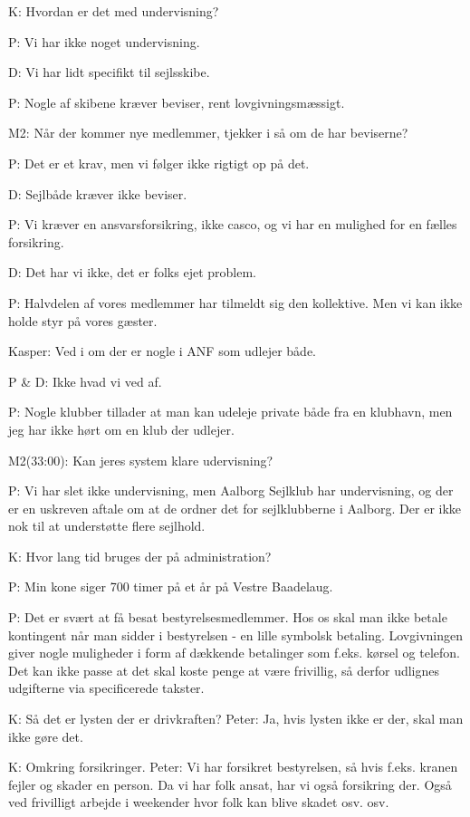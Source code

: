 \documentclass{article}
\begin{document}
K: Hvordan er det med undervisning?

P: Vi har ikke noget undervisning.

D: Vi har lidt specifikt til sejlsskibe.

P: Nogle af skibene kræver beviser, rent lovgivningsmæssigt. 

M2: Når der kommer nye medlemmer, tjekker i så om de har beviserne?

P: Det er et krav, men vi følger ikke rigtigt op på det.

D: Sejlbåde kræver ikke beviser.

P: Vi kræver en ansvarsforsikring, ikke casco, og vi har en mulighed for en fælles forsikring.

D: Det har vi ikke, det er folks ejet problem.

P: Halvdelen af vores medlemmer har tilmeldt sig den kollektive. Men vi kan ikke holde styr på vores gæster.

Kasper: Ved i om der er nogle i ANF som udlejer både.

P \& D: Ikke hvad vi ved af.

P: Nogle klubber tillader at man kan udeleje private både fra en klubhavn, men jeg har ikke hørt om en klub der udlejer.


M2(33:00): Kan jeres system klare udervisning?

P: Vi har slet ikke undervisning, men Aalborg Sejlklub har undervisning, og der er en uskreven aftale om at de ordner det for sejlklubberne i Aalborg. Der er ikke nok til at understøtte flere sejlhold.


K: Hvor lang tid bruges der på administration?

P: Min kone siger 700 timer på et år på Vestre Baadelaug.

P: Det er svært at få besat bestyrelsesmedlemmer. Hos os skal man ikke betale kontingent når man sidder i bestyrelsen - en lille symbolsk betaling. Lovgivningen giver nogle muligheder i form af dækkende betalinger som f.eks. kørsel og telefon. Det kan ikke passe at det skal koste penge at være frivillig, så derfor udlignes udgifterne via specificerede takster.

K: Så det er lysten der er drivkraften? Peter: Ja, hvis lysten ikke er der, skal man ikke gøre det.

K: Omkring forsikringer. Peter: Vi har forsikret bestyrelsen, så hvis f.eks. kranen fejler og skader en person. Da vi har folk ansat, har vi også forsikring der. Også ved frivilligt arbejde i weekender hvor folk kan blive skadet osv. osv.
\end{document}
